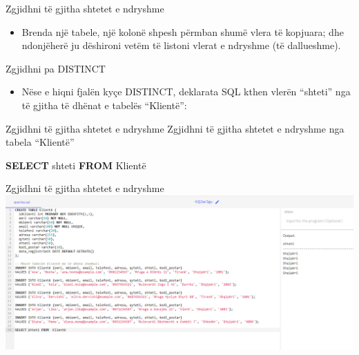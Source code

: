 \documentclass[
  ignorenonframetext,
]{beamer}
\newenvironment{Shaded}{\begin{snugshade}}{\end{snugshade}}
\newcommand{\KeywordTok}[1]{\textcolor[rgb]{0.13,0.29,0.53}{\textbf{#1}}}
\newcommand{\NormalTok}[1]{#1}
\providecommand{\tightlist}{%
  \setlength{\itemsep}{0pt}\setlength{\parskip}{0pt}}
\begin{document}
\begin{frame}{Zgjidhni të gjitha shtetet e ndryshme}
\label{zgjidhni-tuxeb-gjitha-shtetet-e-ndryshme-2}
\begin{itemize}
\tightlist
\item
  Brenda një tabele, një kolonë shpesh përmban shumë vlera të kopjuara;
  dhe ndonjëherë ju dëshironi vetëm të listoni vlerat e ndryshme (të
  dallueshme).
\end{itemize}
\end{frame}

\begin{frame}{Zgjidhni pa DISTINCT}
\label{zgjidhni-pa-distinct}
\begin{itemize}
\tightlist
\item
  Nëse e hiqni fjalën kyçe DISTINCT, deklarata SQL kthen vlerën
  ``shteti'' nga të gjitha të dhënat e tabelës ``Klientë'':
\end{itemize}
\end{frame}

\begin{frame}[fragile]{Zgjidhni të gjitha shtetet e ndryshme}
\label{zgjidhni-tuxeb-gjitha-shtetet-e-ndryshme-3}
Zgjidhni të gjitha shtetet e ndryshme nga tabela ``Klientë''

\begin{Shaded}
\begin{Highlighting}[]
\KeywordTok{SELECT}\NormalTok{ shteti }\KeywordTok{FROM}\NormalTok{  Klientë}
\end{Highlighting}
\end{Shaded}
\end{frame}

\begin{frame}{Zgjidhni të gjitha shtetet e ndryshme}
\label{zgjidhni-tuxeb-gjitha-shtetet-e-ndryshme-4}
\includegraphics{./Figs/query4.png}
\end{frame}
\end{document}
